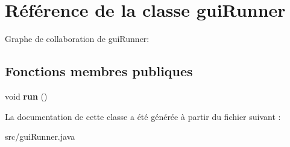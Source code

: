 \hypertarget{classguiRunner}{}\section{Référence de la classe gui\+Runner}
\label{classguiRunner}


Graphe de collaboration de gui\+Runner\+:
\subsection*{Fonctions membres publiques}
\begin{DoxyCompactItemize}
\item 
\mbox{\label{classguiRunner_a84fcde2acb4f6e1731de6553dd5830ed}} 
void {\bfseries run} ()
\end{DoxyCompactItemize}


La documentation de cette classe a été générée à partir du fichier suivant \+:\begin{DoxyCompactItemize}
\item 
src/gui\+Runner.\+java\end{DoxyCompactItemize}
